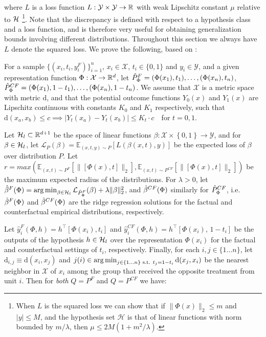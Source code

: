 where $L$ is a loss function $L : \mathcal{Y} \times \mathcal{Y} \rightarrow \mathbb{R}$ with weak Lipschitz constant $\mu$ relative to $\mathcal{H}$ \footnote{When $L$ is the squared loss we can show that if  $\|\Phi(x)\|_2 \leq m$ and $|y|\leq M$, and the hypothesis set $\mathcal{H}$ is that of linear functions with norm bounded by $m/\lambda$, then $\mu \leq 2M (1 + m^2/\lambda )$.}.
Note that the discrepancy is defined with respect to a hypothesis class and a loss function, and is therefore very useful for obtaining generalization bounds involving different distributions. Throughout this section we always have $L$ denote the squared loss.
We prove the following, based on \citet{cortes2014domain}:
\begin{theorem}\label{thrm1}
For a sample $\{(x_i,t_i,y_i^F)\}_{i=1}^n$,  $x_i \in \mathcal{X}$, $t_i \in \{0,1\}$ and $y_i \in \mathcal{Y} $, and a given representation function $\Phi :\mathcal{X} \rightarrow \mathbb{R}^d$, let $\hat{P}_\Phi^{F} = (\Phi(x_1), t_1),  \ldots, (\Phi(x_n), t_n)$, $\hat{P}_\Phi^{CF} = (\Phi(x_1), 1-t_1),  \ldots, (\Phi(x_n), 1-t_n) $. We assume that $\mathcal{X}$ is a metric space with metric $\mathrm{d}$, and that the potential outcome functions $Y_0(x)$  and $Y_1(x)$ are Lipschitz continuous with constants $K_0$ and $K_1$ respectively, such that $\mathrm{d}(x_a,x_b) \leq c \implies |Y_t(x_a) - Y_t(x_b)| \leq K_t \cdot c\,$ \, for $t=0,1$.

Let $\mathcal{H}_l \subset\mathbb{R}^{d+1}$ be the space of linear functions $\beta: \mathcal{X} \times \left\{0,1\right\} \rightarrow \mathcal{Y}$, and for $\beta \in \mathcal{H}_l$, let $\mathcal{L}_{P}(\beta) = \mathbb{E}_{(x,t,y) \sim P} \left[L(\beta(x,t),y)\right]$ be the expected loss of $\beta$ over distribution $P$. Let $r = max\left(\mathbb{E}_{(x,t) \sim P^F}\left[\|[\Phi(x), t]\|_2\right],\mathbb{E}_{(x,t) \sim P^{CF}}\left[\|[\Phi(x), t]\|_2\right]\right)$ be the maximum expected radius of the distributions.
For $\lambda >0$, let $\hat{\beta}^F(\Phi) = \operatorname*{arg\,min}_{\beta \in \mathcal{H}_l} \mathcal{L}_{\hat{P}_\Phi^{F}}(\beta) + \lambda \|\beta\|_2^2$, and  $\hat{\beta}^{CF}(\Phi)$ similarly for $\hat{P}_\Phi^{CF}$, i.e. $\hat{\beta}^F(\Phi)$ and $\hat{\beta}^{CF}(\Phi)$ are the ridge regression solutions for the factual and counterfactual empirical distributions, respectively.

Let $\hat{y}_i^F(\Phi,h) = h^\top [\Phi(x_i) , t_i]$ and $\hat{y}_i^{CF}(\Phi,h) = h^\top [\Phi(x_i) , \, 1-t_i]$ be the outputs of the hypothesis $h \in \mathcal{H}_l$ over the representation $\Phi(x_i)$ for the factual and counterfactual settings of $t_i$, respectively. Finally, for each $i, j \in \{1 \ldots n\}$, let $\mathrm{d}_{i,j} \equiv \mathrm{d}(x_i,x_j)$ and $j(i) \in \operatorname*{arg\,min}_{j \in \{1\ldots n\} \text{ s.t. } t_j = 1-t_i} \mathrm{d}(x_j,x_i)$ be the nearest neighbor in $\mathcal{X}$ of $x_i$ among the group that received the opposite treatment from unit $i$.
Then for \emph{both} $Q = P^F$ and $Q=P^{CF}$ we have:


\end{theorem}
